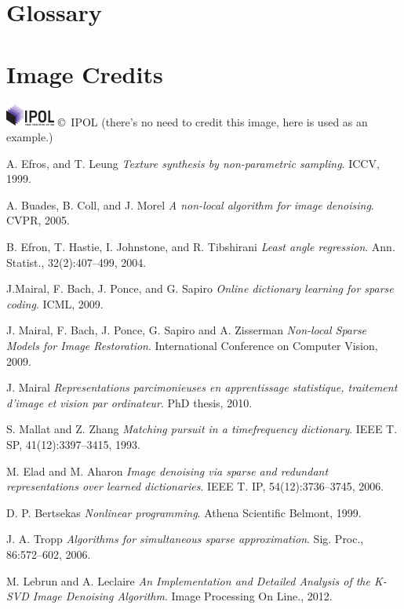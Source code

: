 \documentclass{ipol}
\begin{document}
\section*{Glossary}



\section*{Image Credits}

\includegraphics[height=2em]{ipol_logo} \copyright\ IPOL (there's no
need to credit this image, here is used as an example.)

\begin{thebibliography}{9}

	A. Efros, and T. Leung
	\emph{Texture synthesis by non-parametric sampling}.
	ICCV,
	1999.

	A. Buades, B. Coll, and J. Morel
	\emph{A non-local algorithm for image denoising}.
	CVPR,
	2005.

	B. Efron, T. Hastie, I. Johnstone, and R. Tibshirani
	\emph{Least angle regression}. 
	Ann. Statist.,
	32(2):407–499,
	2004.

	J.Mairal, F. Bach, J. Ponce, and G. Sapiro
	\emph{Online dictionary learning for sparse coding}.
	ICML,
	2009.

	J. Mairal, F. Bach, J. Ponce, G. Sapiro and A. Zisserman
	\emph{ Non-local Sparse Models for Image Restoration}.
	International Conference on Computer Vision,
	2009.

	J. Mairal
	\emph{ Representations parcimonieuses en apprentissage statistique, traitement d’image et
vision par ordinateur}.
	PhD thesis,
	2010.

	S. Mallat and Z. Zhang
 	\emph{Matching pursuit in a timefrequency dictionary}.
	IEEE T. SP,
	41(12):3397–3415,
	1993.

	M. Elad and M. Aharon
	\emph{Image denoising via sparse and redundant representations over learned dictionaries}.
	IEEE T.
	IP, 54(12):3736–3745,
	2006.
	
	D. P. Bertsekas
	\emph{Nonlinear programming}.
	Athena Scientific Belmont,
	1999.
	
	J. A. Tropp
	\emph{Algorithms for simultaneous sparse approximation}.
	Sig. Proc.,
	86:572–602,
	2006.
	
	M. Lebrun and A. Leclaire
	\emph{{An Implementation and Detailed Analysis of the K-SVD Image Denoising Algorithm}}.
	{{Image Processing On Line}}.,
	2012.

\end{thebibliography}
\end{document}

